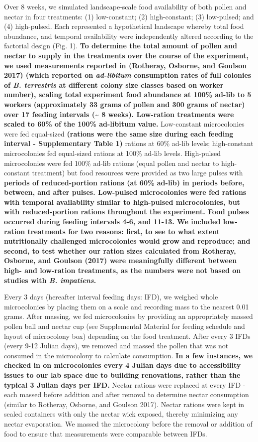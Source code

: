 \documentclass[11pt,]{article}
\begin{document}
Over 8 weeks, we simulated landscape-scale food availability of both
pollen and nectar in four treatments: (1) low-constant; (2)
high-constant; (3) low-pulsed; and (4) high-pulsed. Each represented a
hypothetical landscape whereby total food abundance, and temporal
availability were independently altered according to the factorial
design (Fig. 1). \textbf{To determine the total amount of pollen and
nectar to supply in the treatments over the course of the experiment, we
used measurements reported in (Rotheray, Osborne, and Goulson 2017)
(which reported on \emph{ad-libitum} consumption rates of full colonies
of \emph{B. terrestris} at different colony size classes based on worker
number), scaling total experiment food abundance at 100\% ad-lib to 5
workers (approximately 33 grams of pollen and 300 grams of nectar) over
17 feeding intervals (\textasciitilde{} 8 weeks). Low-ration treatments
were scaled to 60\% of the 100\% ad-libitum value.} Low-constant
microcolonies were fed equal-sized \textbf{(rations were the same size
during each feeding interval - Supplementary Table 1)} rations at 60\%
ad-lib levels; high-constant microcolonies fed equal-sized rations at
100\% ad-lib levels. High-pulsed microcolonies were fed 100\% ad-lib
rations (equal pollen and nectar to high-constant treatment) but food
resources were provided as two large pulses with \textbf{periods of
reduced-portion rations (at 60\% ad-lib) in periods before, between, and
after pulses. Low-pulsed microcolonies were fed rations with temporal
availability similar to high-pulsed microcolonies, but with
reduced-portion rations throughout the experiment. Food pulses occurred
during feeding intervals 4-6, and 11-13. We included low-ration
treatments for two reasons: first, to see to what extent nutritionally
challenged microcolonies would grow and reproduce; and second, to test
whether our ration sizes calculated from Rotheray, Osborne, and Goulson
(2017) were meaningfully different between high- and low-ration
treatments, as the numbers were not based on studies with \emph{B.
impatiens}.}

Every 3 days (hereafter interval feeding days: IFD), we weighed whole
microcolonies by placing them on a scale and recording mass to the
nearest 0.01 grams. After massing, we fed microcolonies by providing an
appropriately massed pollen ball and nectar cup (see Supplemental
Material for feeding schedule and layout of microcolony box) depending
on the food treatment. After every 3 IFDs (every 9-12 Julian days), we
removed and massed the pollen that was not consumed in the microcolony
to calculate consumption. \textbf{In a few instances, we checked in on
microcolonies every 4 Julian days due to accessibility issues to our lab
space due to building renovations, rather than the typical 3 Julian days
per IFD.} Nectar rations were replaced at every IFD - each massed before
addition and after removal to determine nectar consumption (similar to
Rotheray, Osborne, and Goulson 2017). Nectar rations were kept in sealed
containers with only the nectar wick exposed, thereby minimizing any
nectar evaporation. We massed the microcolony before the removal or
addition of food to ensure that measurements were comparable between
IFDs.
\end{document}
